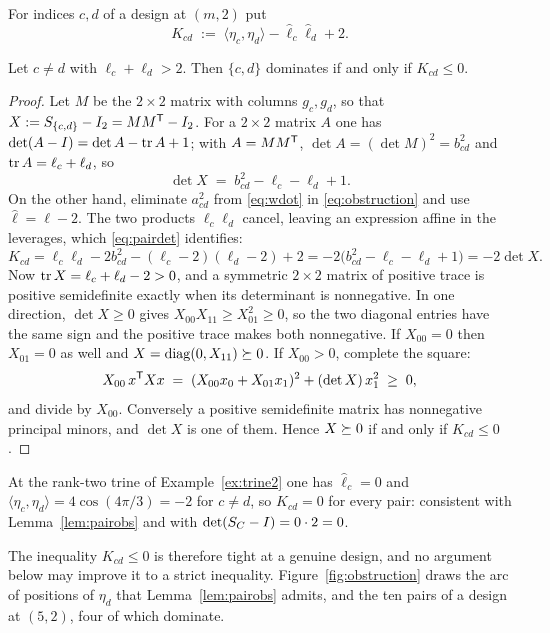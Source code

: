 \begin{definition}\label{def:obstruction}
For indices $c,d$ of a design at $(m,2)$ put
\begin{equation}\label{eq:obstruction}
  K_{cd}\;:=\;\langle \eta_c,\eta_d\rangle-\hat\ell_c\hat\ell_d+2 .
\end{equation}
\end{definition}

\begin{lemma}\label{lem:pairobs}
Let $c\ne d$ with $\ell_c+\ell_d>2$.  Then $\{c,d\}$ dominates if and only
if $K_{cd}\le0$.
\end{lemma}

\begin{proof}
Let $M$ be the $2\times2$ matrix with columns $g_c,g_d$, so that
$X:=S_{\{c,d\}}-I_2=MM^{\mathsf{T}}-I_2$.  For a $2\times2$ matrix $A$ one has
$\det(A-I)=\det A-\operatorname{tr} A+1$; with $A=MM^{\mathsf{T}}$, $\det A=(\det M)^2=b_{cd}^2$
and $\operatorname{tr} A=\ell_c+\ell_d$, so
\begin{equation}\label{eq:pairdet}
  \det X\;=\;b_{cd}^2-\ell_c-\ell_d+1 .
\end{equation}
On the other hand, eliminate $a_{cd}^2$ from \eqref{eq:wdot} in
\eqref{eq:obstruction} and use $\hat\ell=\ell-2$.  The two products
$\ell_c\ell_d$ cancel, leaving an expression affine in the leverages,
which \eqref{eq:pairdet} identifies:
\[
  K_{cd}
  =\ell_c\ell_d-2b_{cd}^2-(\ell_c-2)(\ell_d-2)+2
  =-2\bigl(b_{cd}^2-\ell_c-\ell_d+1\bigr)
  =-2\det X .
\]
Now $\operatorname{tr} X=\ell_c+\ell_d-2>0$, and a symmetric $2\times2$ matrix of
positive trace is positive semidefinite exactly when its determinant is
nonnegative.  In one direction, $\det X\ge0$ gives
$X_{00}X_{11}\ge X_{01}^2\ge0$, so the two diagonal entries have the same
sign and the positive trace makes both nonnegative.  If $X_{00}=0$ then
$X_{01}=0$ as well and $X=\operatorname{diag}(0,X_{11})\succeq0$.  If $X_{00}>0$, complete
the square:
\[
  X_{00}\,x^{\mathsf{T}} Xx\;=\;(X_{00}x_0+X_{01}x_1)^2+(\det X)\,x_1^2\;\ge\;0 ,
\]
and divide by $X_{00}$.  Conversely a positive semidefinite matrix has
nonnegative principal minors, and $\det X$ is one of them.  Hence
$X\succeq0$ if and only if $K_{cd}\le0$.
\end{proof}

At the rank-two trine of Example~\ref{ex:trine2} one has $\hat\ell_c=0$ and $\langle
\eta_c,\eta_d\rangle=4\cos(4\pi/3)=-2$ for $c\ne d$, so $K_{cd}=0$ for every
pair: consistent with Lemma~\ref{lem:pairobs} and with
$\det(S_{C}-I)=0\cdot2=0$.

The inequality $K_{cd}\le0$ is therefore tight at a genuine design, and no
argument below may improve it to a strict inequality.
Figure~\ref{fig:obstruction} draws the arc of positions of $\eta_d$ that
Lemma~\ref{lem:pairobs} admits, and the ten pairs of a design at $(5,2)$,
four of which dominate.

